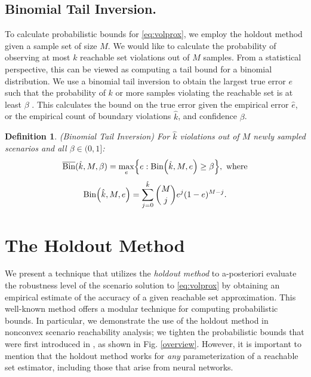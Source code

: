 \documentclass[letterpaper, 10 pt, conference]{ieeeconf}  %
\newtheorem{definition}{Definition}
\begin{document}
\subsection{Binomial Tail Inversion.}
\label{bti}
To calculate probabilistic bounds for \eqref{eq:volprox}, we employ the holdout method given a sample set of size $M$. We would like to calculate the probability of observing at most $k$ reachable set violations out of $M$ samples. From a statistical perspective, this can be viewed as computing a tail bound for a binomial distribution. We use a binomial tail inversion to obtain the largest true error $e$ such that the probability of $k$ or more samples violating the reachable set is at least $\beta$ \cite{langford2005tutorial}.
This calculates the bound on the true error given the empirical error $\hat{e}$, or the empirical count of boundary violations $\hat{k}$, and confidence $\beta$.
\begin{definition}
\label{def:binomial_tail_inversion}
(Binomial Tail Inversion)
For $\hat{k}$ violations out of $M$ newly sampled scenarios and all $\beta \in (0, 1]$:
    \begin{equation}
        \overline{\text{Bin}}(\hat{k}, M, \beta) = \max_{e}\Bigl\{ e : \text{Bin}\Bigl(\hat{k}, M, e \Bigr) \geq \beta \Bigr\}, \,\,\text{where}
        \label{binominversion}
    \end{equation}
    \begin{equation}
        \text{Bin}\Bigl(\hat{k}, M, e \Bigr) =  \sum_{j=0}^{\hat{k}} \binom Mj e^j (1-e)^{M-j}.
    \end{equation}
    \label{def1}
\end{definition}


\section{The Holdout Method}
\label{holdout}
We present a technique that utilizes the \textit{holdout method} to a-posteriori evaluate the robustness level of the scenario solution to \eqref{eq:volprox} by obtaining an empirical estimate of the accuracy of a given reachable set approximation. This well-known method offers a modular technique for computing probabilistic bounds. In particular, we demonstrate the use of the holdout method in nonconvex scenario reachability analysis; we tighten the probabilistic bounds that were first introduced in \cite{pmlr-v242-dietrich24a}, as shown in Fig. \ref{overview}.  However, it is important to mention that the holdout method works for \textit{any} parameterization of a reachable set estimator, including those that arise from neural networks. 
\end{document}

